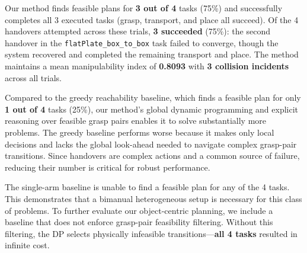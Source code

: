 \begin{table}[h]
\centering
\caption{Method comparison across all 4 tasks. Planning success indicates fraction of tasks for which a feasible assignment was found. Execution metrics are reported only for successfully planned tasks. HO\,Succ.\ reports fraction of handovers successfully completed out of total attempted.}
\label{tab:method_comparison}
\end{table}

Our method finds feasible plans for \textbf{3 out of 4} tasks (75\%) and successfully completes all 3 executed tasks (grasp, transport, and place all succeed). Of the 4 handovers attempted across these trials, \textbf{3 succeeded} (75\%): the second handover in the \texttt{flatPlate\_box\_to\_box} task failed to converge, though the system recovered and completed the remaining transport and place. The method maintains a mean manipulability index of \textbf{0.8093} with \textbf{3 collision incidents} across all trials.

Compared to the greedy reachability baseline, which finds a feasible plan for only \textbf{1 out of 4} tasks (25\%), our method's global dynamic programming and explicit reasoning over feasible grasp pairs enables it to solve substantially more problems. The greedy baseline performs worse because it makes only local decisions and lacks the global look-ahead needed to navigate complex grasp-pair transitions. Since handovers are complex actions and a common source of failure, reducing their number is critical for robust performance.

The single-arm baseline is unable to find a feasible plan for any of the 4 tasks. This demonstrates that a bimanual heterogeneous setup is necessary for this class of problems. To further evaluate our object-centric planning, we include a baseline that does not enforce grasp-pair feasibility filtering. Without this filtering, the DP selects physically infeasible transitions---\textbf{all 4 tasks} resulted in infinite cost.


